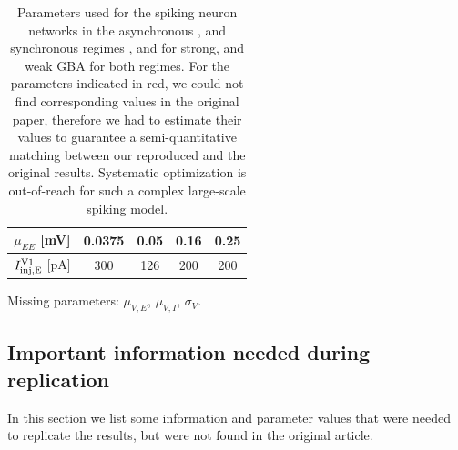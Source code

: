 \begin{table}[!ht]
\begin{tabular}{c|c|c|c|c|}
\multicolumn{1}{|c|}{$\mu_{EE}$ {[}mV{]}}                & 0.0375              & 0.05                 & 0.16               & 0.25                 \\ \hline
\multicolumn{1}{|c|}{$I_{\rm inj, E}^{\rm V1}$ {[}pA{]}} & 300                 & 126                  & 200                & 200                  \\ \hline
\end{tabular}
\caption{Parameters used for the spiking neuron networks in the asynchronous , and synchronous regimes , and for strong, and weak GBA for both regimes. For the parameters indicated in red, we could not find corresponding values in the original paper, therefore we had to estimate their values to guarantee a semi-quantitative matching between our reproduced and the original results. Systematic optimization is out-of-reach for such a complex large-scale spiking model.} Missing parameters: $\mu_{V,E}$, $\mu_{V,I}$, $\sigma_V$.\label{tab:par_spike}
\end{table}

\subsection{Important information needed during replication}
\label{important_info}

In this section we list some information and parameter values that were needed to replicate the results, but were not found in the original article.


